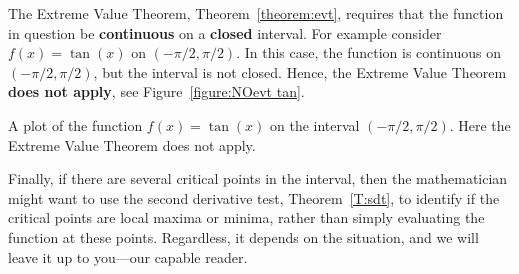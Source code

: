 \begin{warning}
The Extreme Value Theorem, Theorem~\ref{theorem:evt}, requires that
the function in question be \textbf{continuous} on a \textbf{closed}
interval.  For example consider $f(x)=\tan(x)$ on $(-\pi/2,
\pi/2)$. In this case, the function is continuous on $(-\pi/2,\pi/2)$,
but the interval is not closed. Hence, the Extreme Value Theorem
\textbf{does not apply}, see Figure~\ref{figure:NOevt tan}.
\end{warning}\begin{marginfigure}
\caption{A plot of the function $f(x) = \tan(x)$ on the interval
  $(-\pi/2,\pi/2)$. Here the Extreme Value Theorem does not apply.}
\label{figure:NOevt tan}
\end{marginfigure}

Finally, if there are several critical points in the interval, then
the mathematician might want to use the second derivative test,
Theorem~\ref{T:sdt}, to identify if the critical points are local
maxima or minima, rather than simply evaluating the function at these
points. Regardless, it depends on the situation, and we will leave it
up to you---our capable reader.





